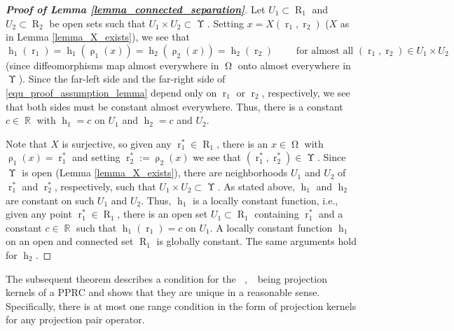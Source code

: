 \documentclass[12pt]{article}
\DeclareMathOperator{\Xgroundset}{\Upsilon}
\DeclareMathOperator{\RR}{{\mathbb{R}}}
\DeclareMathOperator{\rayvariable}{r}
\DeclareMathOperator{\raygroundset}{R}
\DeclareMathOperator{\rayinverse}{\rho}
\DeclareMathOperator{\stripfkt}{h}
\DeclareMathOperator{\Vone}{V_1}
\DeclareMathOperator{\Vtwo}{V_2}
\newcommand{\conditionname}{$\mathrm{PPRC}$}
\DeclareMathOperator{\imgdom}{{\Omega}}
\begin{document}
\begin{proof}[\textbf{Proof of Lemma \ref{lemma_connected_separation}}]

Let $U_1\subset \raygroundset_1$ and $U_2\subset \raygroundset_2$  be open sets such that $U_1\times U_2\subset \Xgroundset$.
Setting $x=X(\rayvariable_1,\rayvariable_2)$ ($X$ as in Lemma \ref{lemma_X_exists}), we see that 
\begin{equation} \label{equ_proof_assumption_lemma}
 \stripfkt_1(\rayvariable_1)= \stripfkt_1(\rayinverse_1(x))= \stripfkt_2(\rayinverse_2(x))= \stripfkt_2(\rayvariable_2) \qquad \text{ for almost all  $(\rayvariable_1,\rayvariable_2)\in U_1\times U_2$}
 \end{equation}
 (since diffeomorphisms map almost everywhere in $\imgdom$ onto almost everywhere in $\Xgroundset$). Since the far-left  side and the far-right side of \eqref{equ_proof_assumption_lemma} depend only on $\rayvariable_1$ or $\rayvariable_2$, respectively, we see that both sides must be constant almost everywhere. Thus, there is a constant $c\in \RR$ with $\stripfkt_1=c$ on $U_1$ and $\stripfkt_2=c$ and $U_2$.
 
Note that $X$ is surjective, so given any $\rayvariable_1^*\in \raygroundset_1$, there is an $x\in \imgdom$ with $\rayinverse_1(x)=\rayvariable_1^*$ and setting $\rayvariable_2^*:=\rayinverse_2(x)$ we see that $(\rayvariable_1^*,\rayvariable_2^*)\in \Xgroundset$. Since $\Xgroundset$ is open (Lemma \ref{lemma_X_exists}), there are neighborhoods $U_1$ and $U_2$ of $\rayvariable_1^*$ and $\rayvariable_2^*$, respectively, such that $U_1\times U_2\subset \Xgroundset$.
As stated above, $\stripfkt_1$ and $\stripfkt_2$ are constant on such $U_1$ and $U_2$. Thus, $\stripfkt_1$ is a locally constant function, i.e., given any point $\rayvariable_1^* \in \raygroundset_1$, there is an open set $U_1\subset \raygroundset_1$ containing $\rayvariable_1^*$ and a constant $c\in \RR$ such that $\stripfkt_1(\rayvariable_1)=c$ on $U_1$.
A locally constant function $\stripfkt_1$ on an
open and connected set $\raygroundset_1$ is globally constant. The same arguments hold for $\stripfkt_2$.
\end{proof}



The subsequent theorem describes a condition for the $\Vone, \Vtwo$ being projection kernels of a \conditionname{} and shows that they are unique in a reasonable sense. Specifically, there is at most one range condition in the form of projection kernels for any projection pair operator.
\end{document}
